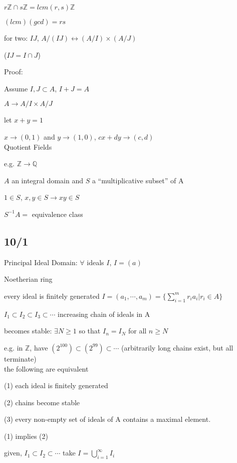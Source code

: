 \documentclass[12pt]{article}
\newcommand{\inv}{^{-1}}
\begin{document}
$r\mathds{Z} \cap s\mathds{Z} = lcm(r, s)\mathds{Z}$

$(lcm)(gcd) = rs$

\noindent
for two: $IJ$, $A/(IJ) \leftrightarrow (A/I) \times (A/J)$

($IJ = I \cap J$)

\noindent
Proof:

Assume $I, J \subset A$, $I + J = A$

$A \to A/I \times A/J$

let $x + y = 1$

$x \to (0, 1)$ and $y \to (1, 0)$, $cx + dy \to (c, d)$\\

\noindent
Quotient Fields

e.g. $\mathds{Z} \to \mathds{Q}$

$A$ an integral domain and $S$ a ``multiplicative subset'' of A

$1 \in S$, $x, y \in S \to xy \in S$

$S\inv A = $ equivalence class

\subsection{10/1}

\noindent
Principal Ideal Domain: $\forall$ ideals $I$, $I = (a)$

\noindent
Noetherian ring

every ideal is finitely generated $I = (a_1, \cdots, a_m) = \{\sum_{i=1}^mr_ia_i | r_i \in A\}$

\noindent
$I_1 \subset I_2 \subset I_3 \subset \cdots$ increasing chain of ideals in A

becomes stable: $\exists N \geq 1$ so that $I_n = I_N$ for all $n \geq N$

e.g. in $\mathds{Z}$, have $(2^{100}) \subset (2^{99}) \subset \cdots$ (arbitrarily long chains exist, but all terminate)\\

\noindent
the following are equivalent

(1) each ideal is finitely generated

(2) chains become stable

(3) every non-empty set of ideals of A contains a maximal element.

\noindent
(1) implies (2)

given, $I_1 \subset I_2 \subset \cdots$ take $I = \bigcup_{i = 1}^\infty I_i$
\end{document}
